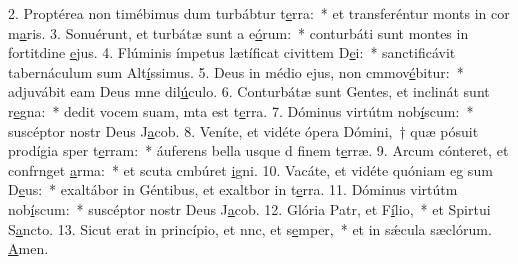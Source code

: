 2. Proptérea non timébimus dum turbábtur t\uline{e}rra:~* et transferéntur monts in cor m\uline{a}ris.
3. Sonuérunt, et turbátæ sunt a e\uline{ó}rum:~* conturbáti sunt montes in fortitdine \uline{e}jus.
4. Flúminis ímpetus lætíficat civittem D\uline{e}i:~* sanctificávit tabernáculum sum Alt\uline{í}ssimus.
5. Deus in médio ejus, non cmmov\uline{é}bitur:~* adjuvábit eam Deus mne dil\uline{ú}culo.
6. Conturbátæ sunt Gentes, et inclinát sunt r\uline{e}gna:~* dedit vocem suam, mta est t\uline{e}rra.
7. Dóminus virtútm nob\uline{í}scum:~* suscéptor nostr Deus J\uline{a}cob.
8. Veníte, et vidéte ópera Dómini,~† quæ pósuit prodígia sper t\uline{e}rram:~* áuferens bella usque d finem t\uline{e}rræ.
9. Arcum cónteret, et confrnget \uline{a}rma:~* et scuta cmbúret \uline{i}gni.
10. Vacáte, et vidéte quóniam eg sum D\uline{e}us:~* exaltábor in Géntibus, et exaltbor in t\uline{e}rra.
11. Dóminus virtútm nob\uline{í}scum:~* suscéptor nostr Deus J\uline{a}cob.
12. Glória Patr, et F\uline{í}lio,~* et Spirtui S\uline{a}ncto.
13. Sicut erat in princípio, et nnc, et s\uline{e}mper,~* et in sǽcula sæclórum. \uline{A}men.
